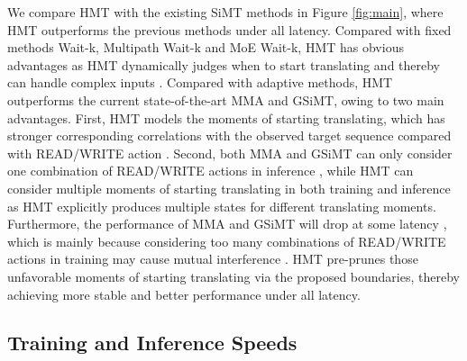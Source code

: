 \documentclass{article} %
\begin{document}
We compare HMT with the existing SiMT methods in Figure \ref{fig:main}, where HMT outperforms the previous methods under all latency.
Compared with fixed methods Wait-k, Multipath Wait-k and MoE Wait-k, HMT has obvious advantages as HMT dynamically judges when to start translating and thereby can handle complex inputs \citep{Arivazhagan2019}. Compared with adaptive methods, HMT outperforms the current state-of-the-art MMA and GSiMT, owing to two main advantages. First, HMT models the moments of starting translating, which has stronger corresponding correlations with the observed target sequence compared with READ/WRITE action \citep{zhang-feng-2022-gaussian}. Second, both MMA and GSiMT can only consider one combination of READ/WRITE actions in inference \citep{Ma2019a,miao-etal-2021-generative}, while HMT can consider multiple moments of starting translating in both training and inference as HMT explicitly produces multiple states for different translating moments.
Furthermore, the performance of MMA and GSiMT will drop at some latency \citep{Ma2019a}, which is mainly because considering too many combinations of READ/WRITE actions in training may cause mutual interference \citep{multipath,zhang-feng-2021-universal,pmlr-v139-wu21e}. HMT pre-prunes those unfavorable moments of starting translating via the proposed boundaries, thereby achieving more stable and better performance under all latency. 





\subsection{Training and Inference Speeds}
\end{document}
